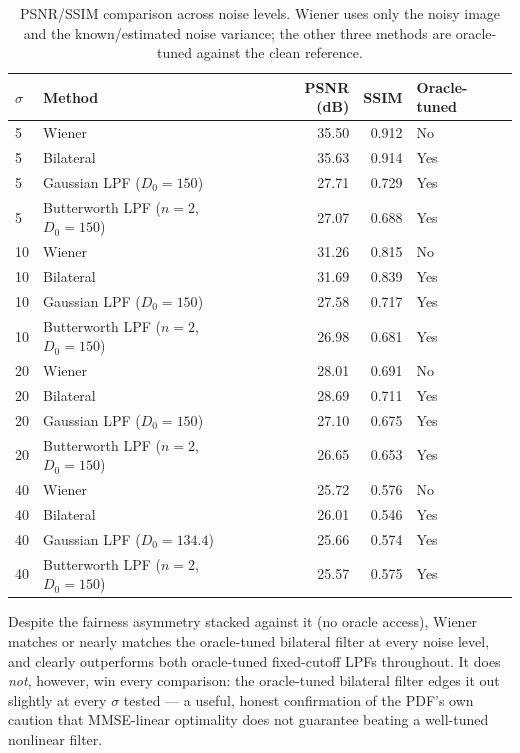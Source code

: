 \documentclass[11pt]{article}
\begin{document}
\begin{table}[H]
\centering
\caption{PSNR/SSIM comparison across noise levels. Wiener uses only the noisy image and the
known/estimated noise variance; the other three methods are oracle-tuned against the clean
reference.}
\label{tab:psnr_ssim}
\begin{tabular}{llrrl}
\toprule
$\sigma$ & Method & PSNR (dB) & SSIM & Oracle-tuned \\
\midrule
5  & Wiener                & 35.50 & 0.912 & No \\
5  & Bilateral              & 35.63 & 0.914 & Yes \\
5  & Gaussian LPF ($D_0{=}150$)     & 27.71 & 0.729 & Yes \\
5  & Butterworth LPF ($n{=}2$, $D_0{=}150$) & 27.07 & 0.688 & Yes \\
\midrule
10 & Wiener                & 31.26 & 0.815 & No \\
10 & Bilateral              & 31.69 & 0.839 & Yes \\
10 & Gaussian LPF ($D_0{=}150$)     & 27.58 & 0.717 & Yes \\
10 & Butterworth LPF ($n{=}2$, $D_0{=}150$) & 26.98 & 0.681 & Yes \\
\midrule
20 & Wiener                & 28.01 & 0.691 & No \\
20 & Bilateral              & 28.69 & 0.711 & Yes \\
20 & Gaussian LPF ($D_0{=}150$)     & 27.10 & 0.675 & Yes \\
20 & Butterworth LPF ($n{=}2$, $D_0{=}150$) & 26.65 & 0.653 & Yes \\
\midrule
40 & Wiener                & 25.72 & 0.576 & No \\
40 & Bilateral              & 26.01 & 0.546 & Yes \\
40 & Gaussian LPF ($D_0{=}134.4$)   & 25.66 & 0.574 & Yes \\
40 & Butterworth LPF ($n{=}2$, $D_0{=}150$) & 25.57 & 0.575 & Yes \\
\bottomrule
\end{tabular}
\end{table}

Despite the fairness asymmetry stacked against it (no oracle access), Wiener matches or nearly
matches the oracle-tuned bilateral filter at every noise level, and clearly outperforms both
oracle-tuned fixed-cutoff LPFs throughout. It does \emph{not}, however, win every comparison:
the oracle-tuned bilateral filter edges it out slightly at every $\sigma$ tested — a useful,
honest confirmation of the PDF's own caution that MMSE-linear optimality does not guarantee
beating a well-tuned nonlinear filter.
\end{document}
